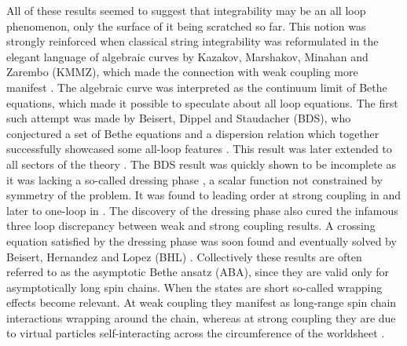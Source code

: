 All of these results seemed to suggest that integrability may be an all loop phenomenon, only the surface of it being scratched so far. 
This notion was strongly reinforced when classical string integrability was reformulated in the elegant language of algebraic curves by Kazakov, Marshakov, Minahan and Zarembo (KMMZ), which made the connection with weak coupling more manifest \cite{Kazakov:2004qf}. 
The algebraic curve was interpreted as the continuum limit of Bethe equations, which made it possible to speculate about all loop equations.
The first such attempt was made by Beisert, Dippel and Staudacher (BDS), who conjectured a set of Bethe equations and a dispersion relation which together successfully showcased some all-loop features \cite{Beisert:2004hm}.
This result was later extended to all sectors of the theory \cite{Beisert:2005fw}.
The BDS result was quickly shown to be incomplete as it was lacking a so-called dressing phase \cite{Arutyunov:2004vx}, a scalar function not constrained by symmetry of the problem.
It was found to leading order at strong coupling in \cite{Arutyunov:2004vx} and later to one-loop in \cite{Hernandez:2006tk}.
The discovery of the dressing phase also cured the infamous three loop discrepancy between weak and strong coupling results.
A crossing equation satisfied by the dressing phase was soon found \cite{Janik:2006dc} and eventually solved by Beisert, Hernandez and Lopez (BHL) \cite{Beisert:2006ib}.  
Collectively these results are often referred to as the asymptotic Bethe ansatz (ABA), since they are valid only for asymptotically long spin chains. 
When the states are short so-called wrapping effects become relevant. 
At weak coupling they manifest as long-range spin chain interactions wrapping around the chain, whereas at strong coupling they are due to virtual particles self-interacting across the circumference of the worldsheet \cite{Sieg:2005kd, Ambjorn:2005wa}.

